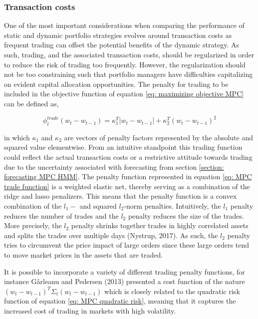 \subsubsection{Transaction costs}
One of the most important considerations when comparing the performance of static and dynamic portfolio strategies evolves around transaction costs as frequent trading can offset the potential benefits of the dynamic strategy. As such, trading, and the associated transaction costs, should be regularized in order to reduce the risk of trading too frequently. However, the regularization should not be too constraining such that portfolio managers have difficulties capitalizing on evident capital allocation opportunities. The penalty for trading to be included in the objective function of equation \ref{eq: maximizing objective MPC} can be defined as, 

\begin{equation}
    \phi_t^{trade}(w_t-w_{t-1}) = \kappa_1^T|w_t-w_{t-1}| + \kappa_2^T(w_t-w_{t-1})^2
    \label{eq: MPC trade function}
\end{equation}

in which $\kappa_1$ and $\kappa_2$ are vectors of penalty factors represented by the absolute and squared value elementwise. From an intuitive standpoint this trading function could reflect the actual transaction costs or a restrictive attitude towards trading due to the uncertainty associated with forecasting from section \ref{section: forecasting MPC HMM}. The penalty function represented in equation \ref{eq: MPC trade function} is a weighted elastic net, thereby serving as a combination of the ridge and lasso penalizers. This means that the penalty function is a convex combination of the $l_1-$ and squared $l_2$-norm penalties. Intuitively, the $l_1$ penalty reduces the number of trades and the $l_2$ penalty reduces the size of the trades. More precisely, the $l_2$ penalty shrinks together trades in highly correlated assets and splits the trades over multiple days (Nystrup, 2017). As such, the $l_2$ penalty tries to circumvent the price impact of large orders since these large orders tend to move market prices in the assets that are traded. 

It is possible to incorporate a variety of different trading penalty functions, for instance Gârleanu and Pedersen (2013) presented a cost function of the nature $(w_t-w_{t-1})^T\Sigma_t(w_t-w_{t-1})$ which is closely related to the quadratic risk function of equation \ref{eq: MPC quadratic risk}, meaning that it captures the increased cost of trading in markets with high volatility.

